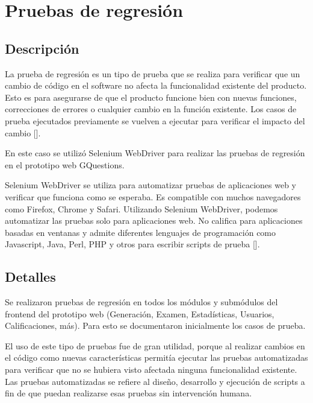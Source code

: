 \documentclass[../Main.tex]{subfiles}
\begin{document}
    \section{Pruebas de regresión}
    \subsection{Descripción}
    \begin{justify}
    La prueba de regresión es un tipo de prueba que se realiza para verificar que un cambio de código en el software no afecta la funcionalidad existente del producto. Esto es para asegurarse de que el producto funcione bien con nuevas funciones, correcciones de errores o cualquier cambio en la función existente. Los casos de prueba ejecutados previamente se vuelven a ejecutar para verificar el impacto del cambio []. %
    
    En este caso se utilizó Selenium WebDriver para realizar las pruebas de regresión en el prototipo web GQuestions. 
    
    Selenium WebDriver se utiliza para automatizar pruebas de aplicaciones web y verificar que funciona como se esperaba. Es compatible con muchos navegadores como Firefox, Chrome y Safari. Utilizando Selenium WebDriver, podemos automatizar las pruebas solo para aplicaciones web. No califica para aplicaciones basadas en ventanas y admite diferentes lenguajes de programación como Javascript, Java, Perl, PHP y otros para escribir scripts de prueba []. %
    
    \end{justify}
    
    \subsection{Detalles}
    \begin{justify}
    Se realizaron pruebas de regresión en todos los módulos y submódulos del frontend del prototipo web (Generación, Examen, Estadísticas, Usuarios, Calificaciones, más). Para esto se documentaron inicialmente los casos de prueba.
    
    El uso de este tipo de pruebas fue de gran utilidad, porque al realizar cambios en el código como nuevas características permitía ejecutar las pruebas automatizadas para verificar que no se hubiera visto afectada ninguna funcionalidad existente. Las pruebas automatizadas se refiere al diseño, desarrollo y ejecución de scripts a fin de que puedan realizarse esas pruebas sin intervención humana. 
    \end{justify}
    
\end{document}
